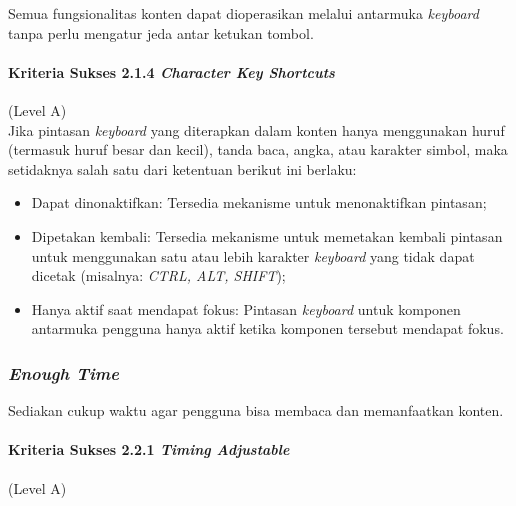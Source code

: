 \documentclass[a4paper,twoside]{article}
\begin{document}
\begin{enumerate}
		Semua fungsionalitas konten dapat dioperasikan melalui antarmuka \textit{keyboard} tanpa perlu mengatur jeda antar ketukan tombol.

		\paragraph{Kriteria Sukses 2.1.4 \textit{Character Key Shortcuts}}
		\label{sec:kriteria_sukses_2.1.4}
		(Level A)\\

		Jika pintasan \textit{keyboard} yang diterapkan dalam konten hanya menggunakan huruf (termasuk huruf besar dan kecil), tanda baca, angka, atau karakter simbol, maka setidaknya salah satu dari ketentuan berikut ini berlaku:
		\begin{itemize}
			\item Dapat dinonaktifkan: Tersedia mekanisme untuk menonaktifkan pintasan;
			\item Dipetakan kembali: Tersedia mekanisme untuk memetakan kembali pintasan untuk menggunakan satu atau lebih karakter \textit{keyboard} yang tidak dapat dicetak (misalnya: \textit{CTRL, ALT, SHIFT});
			\item Hanya aktif saat mendapat fokus: Pintasan \textit{keyboard} untuk komponen antarmuka pengguna hanya aktif ketika komponen tersebut mendapat fokus.
		\end{itemize}

		\subsubsection*{\textit{Enough Time}}
		\label{sec:enough_time}
		Sediakan cukup waktu agar pengguna bisa membaca dan memanfaatkan konten.

		\paragraph{Kriteria Sukses 2.2.1 \textit{Timing Adjustable}}
		\label{sec:kriteria_sukses_2.2.1}
		(Level A)\\


\end{enumerate}
\end{document}
